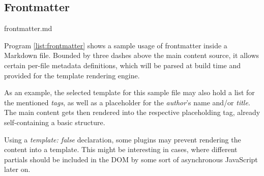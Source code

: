 \subsection{Frontmatter}
\label{sec:buildpipelines-frontmatter}

\begin{program}
  \caption{frontmatter.md}
  \label{list:frontmatter}

\end{program}

Program \ref{list:frontmatter} shows a sample usage of frontmatter inside a Markdown file. Bounded by three dashes above the main content source, it allows certain per-file metadata definitions, which will be parsed at build time and provided for the template rendering engine.

As an example, the selected template for this sample file may also hold a list for the mentioned \emph{tags}, as well as a placeholder for the \emph{author}'s name and/or \emph{title}. The main content gets then rendered into the respective placeholding tag, already self-containing a basic structure.

Using a \emph{template: false} declaration, some plugins may prevent rendering the content into a template. This might be interesting in cases, where different partials should be included in the DOM by some sort of asynchronous JavaScript later on.
